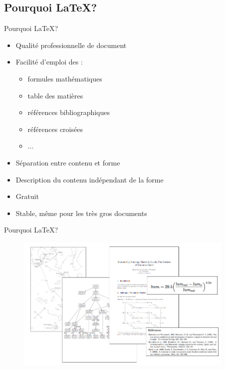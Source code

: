 \documentclass[10pt,svgnames,usenames,table]{beamer} %
\begin{document}
\subsection{Pourquoi \LaTeX{}?}
\begin{frame}{Pourquoi \LaTeX{}?}

  \begin{itemize}
  	\item Qualité professionnelle de document
	\item Facilité d'emploi des :
	\begin{itemize}
		\item formules mathématiques
		\item table des matières
		\item références bibliographiques
		\item références croisées
		\item ...
	\end{itemize}
	\item Séparation entre contenu et forme
	\item Description du contenu indépendant de la forme
	\item Gratuit
	\item Stable, même pour les très gros documents
  \end{itemize}
\end{frame}

\begin{frame}{Pourquoi \LaTeX{}?}

\begin{figure}[htbp]
\begin{center}
\includegraphics[height=6.5cm]{latex_exemples}
\end{center}
\end{figure}
\end{frame}

\end{document}
